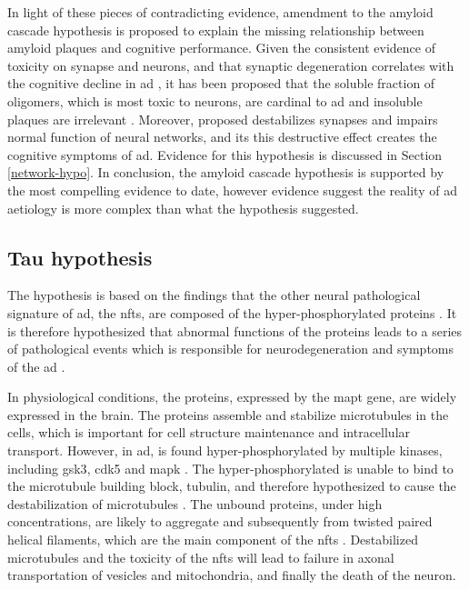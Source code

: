In light of these pieces of contradicting evidence, amendment to the amyloid cascade hypothesis is proposed to explain the missing relationship between amyloid plaques and cognitive performance. Given the consistent evidence of \abeta{} toxicity on synapse and neurons\citep{ferreira15}, and that synaptic degeneration correlates with the cognitive decline in \gls{ad} \citep{selkoe02, coleman04}, it has been proposed that the soluble fraction of \abeta{} oligomers, which is most toxic to neurons, are cardinal to \gls{ad} and insoluble plaques are irrelevant \citep{ferreira15}. Moreover, \citet{canter16} proposed \abeta{} destabilizes synapses and impairs normal function of neural networks, and its this destructive effect creates the cognitive symptoms of \gls{ad}. Evidence for this hypothesis is discussed in Section \ref{network-hypo}. In conclusion, the amyloid cascade hypothesis is supported by the most compelling evidence to date, however evidence suggest the reality of \gls{ad} aetiology is more complex than what the hypothesis suggested.

\subsection{Tau hypothesis}

The \atau{} hypothesis is based on the findings that the other neural pathological signature of \gls{ad}, the \glspl{nft}, are composed of the hyper-phosphorylated \atau{} proteins \citep{grundke-iqbal86}. It is therefore hypothesized that abnormal functions of the \atau{} proteins leads to a series of pathological events which is responsible for neurodegeneration and symptoms of the \gls{ad} \citep{goedert11}.

In physiological conditions, the \atau{} proteins, expressed by the \gls{mapt} gene, are widely expressed in the brain. The \atau{} proteins assemble and stabilize microtubules in the cells, which is important for cell structure maintenance and intracellular transport. However, in \gls{ad}, \atau{} is found hyper-phosphorylated by multiple kinases, including \gls{gsk3}, \gls{cdk5} and \gls{mapk} \citep{singh94}. The hyper-phosphorylated \atau{} is unable to bind to the microtubule building block, tubulin, and therefore hypothesized to cause the destabilization of microtubules \citep{bramblett93, yoshida93, alonso94}. The unbound \atau{} proteins, under high concentrations, are likely to aggregate and subsequently from twisted paired helical filaments, which are the main component of the \glspl{nft} \citep{kidd63, kuret05}. Destabilized microtubules and the toxicity of the \glspl{nft} will lead to failure in axonal transportation of vesicles and mitochondria, and finally the death of the neuron.

